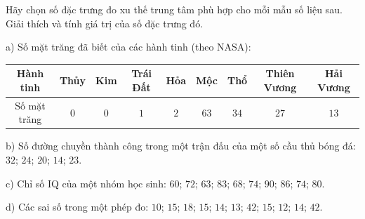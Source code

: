 \begin{ex}
Hãy chọn số đặc trưng đo xu thế trung tâm phù hợp cho mỗi mẫu số liệu sau. Giải thích và tính giá trị của số đặc trưng đó.

a) Số mặt trăng đã biết của các hành tinh (theo NASA):
\begin{center}
\begin{tabular}{|c|c|c|c|c|c|c|c|c|}\hline
Hành tinh & Thủy & Kim & Trái Đất & Hỏa & Mộc & Thổ & Thiên Vương & Hải Vương\\\hline
Số mặt trăng & $0$ & $0$ & $1$ & $2$ & $63$ & $34$ & $27$ & $13$\\\hline
\end{tabular}
\end{center}
b) Số đường chuyền thành công trong một trận đấu của một số cầu thủ bóng đá: $32$; $24$; $20$; $14$; $23$.

c) Chỉ số IQ của một nhóm học sinh: $60$; $72$; $63$; $83$; $68$; $74$; $90$; $86$; $74$; $80$.

d) Các sai số trong một phép đo: $10$; $15$; $18$; $15$; $14$; $13$; $42$; $15$; $12$; $14$; $42$.
\end{ex}
